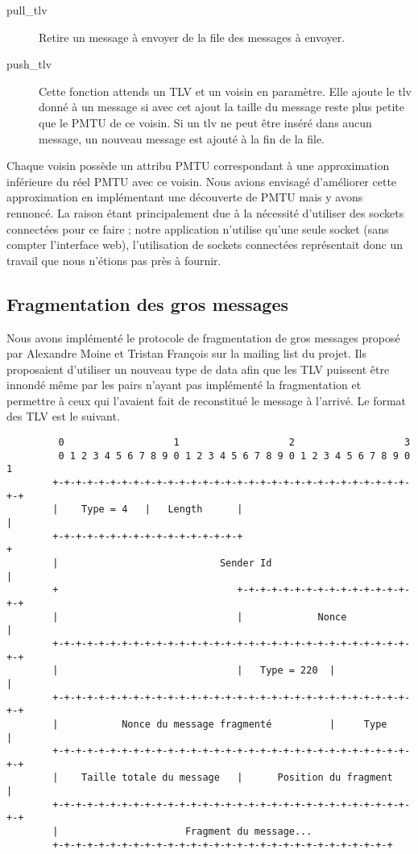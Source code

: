 \documentclass[a4paper,10pt]{article} %
\begin{document}
\begin{description}
\item[pull\_tlv] Retire un message à envoyer de la file des messages à envoyer.
\item[push\_tlv] Cette fonction attends un TLV et un voisin en paramètre. Elle ajoute le tlv donné à un message si avec cet ajout la taille du message reste plus petite que le PMTU de ce voisin. Si un tlv ne peut être inséré dans aucun message, un nouveau message est ajouté à la fin de la file.
\end{description}

Chaque voisin possède un attribu \textrm{PMTU} correspondant à une approximation inférieure du réel \textrm{PMTU} avec ce voisin. Nous avions envisagé d'améliorer cette approximation en implémentant une découverte de PMTU mais y avons rennoncé. La raison étant principalement due à la nécessité d'utiliser des sockets connectées pour ce faire ; notre application n'utilise qu'une seule socket (sans compter l'interface web), l'utilisation de sockets connectées représentait donc un travail que nous n'étions pas près à fournir.


\subsection{Fragmentation des gros messages\label{sec:frag}}
Nous avons implémenté le protocole de fragmentation de gros messages proposé par \textrm{Alexandre Moine} et \textrm{Tristan François} sur la mailing list du projet. Ils proposaient d'utiliser un nouveau type de data afin que les TLV puissent être innondé même par les pairs n'ayant pas implémenté la fragmentation et permettre à ceux qui l'avaient fait de reconstitué le message à l'arrivé. Le format des TLV est le suivant.

\begin{verbatim}
         0                   1                   2                   3
         0 1 2 3 4 5 6 7 8 9 0 1 2 3 4 5 6 7 8 9 0 1 2 3 4 5 6 7 8 9 0 1
        +-+-+-+-+-+-+-+-+-+-+-+-+-+-+-+-+-+-+-+-+-+-+-+-+-+-+-+-+-+-+-+-+
        |    Type = 4   |   Length      |                               |
        +-+-+-+-+-+-+-+-+-+-+-+-+-+-+-+-+                               +
        |                            Sender Id                          |
        +                               +-+-+-+-+-+-+-+-+-+-+-+-+-+-+-+-+
        |                               |             Nonce             |
        +-+-+-+-+-+-+-+-+-+-+-+-+-+-+-+-+-+-+-+-+-+-+-+-+-+-+-+-+-+-+-+-+
        |                               |   Type = 220  |               |
        +-+-+-+-+-+-+-+-+-+-+-+-+-+-+-+-+-+-+-+-+-+-+-+-+-+-+-+-+-+-+-+-+
        |           Nonce du message fragmenté          |     Type      |
        +-+-+-+-+-+-+-+-+-+-+-+-+-+-+-+-+-+-+-+-+-+-+-+-+-+-+-+-+-+-+-+-+
        |    Taille totale du message   |      Position du fragment     |
        +-+-+-+-+-+-+-+-+-+-+-+-+-+-+-+-+-+-+-+-+-+-+-+-+-+-+-+-+-+-+-+-+
        |                      Fragment du message...
        +-+-+-+-+-+-+-+-+-+-+-+-+-+-+-+-+-+-+-+-+-+-+-+-+-+-+-+-+-+
\end{verbatim}
\end{document}
